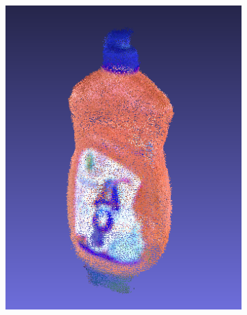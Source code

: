 \documentclass[letterpaper, 10 pt, conference]{ieeeconf}  %
\begin{document}
\begin{figure}[th]
\begin{subfigure}[b]{0.3333\linewidth}
                \includegraphics[width=\linewidth]{../models/aos.png}
        \end{subfigure}
        

\end{figure}
\end{document}
